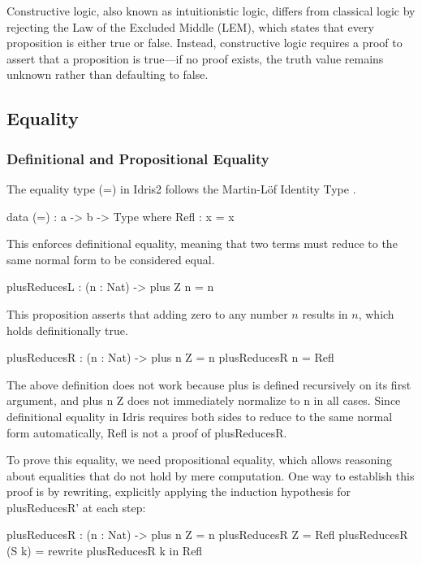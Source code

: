 \documentclass[]{rptuseminar}
\begin{document}
Constructive logic, also known as intuitionistic logic, differs from classical logic by rejecting the Law of the Excluded Middle (LEM), which states that every proposition is either true or false. Instead, constructive logic requires a proof to assert that a proposition is true—if no proof exists, the truth value remains unknown rather than defaulting to false.


\subsection{Equality}
\label{sec:Equality}

\subsubsection{Definitional and Propositional Equality}
The equality type (=) in Idris2 follows the Martin-Löf Identity Type .

\begin{idris}
data (=) : a -> b -> Type where  
Refl : x = x
\end{idris}

This enforces definitional equality, meaning that two terms must reduce to the same normal form to be considered equal.

\begin{idris}
plusReducesL : (n : Nat) -> plus Z n = n
\end{idris}

This proposition asserts that adding zero to any number \( n \) results in \( n \), which holds definitionally true.

\begin{idris}
plusReducesR : (n : Nat) -> plus n Z = n
plusReducesR n = Refl
\end{idris}
The above definition does not work because plus is defined recursively on its first argument, and plus n Z does not immediately normalize to n in all cases. Since definitional equality in Idris requires both sides to reduce to the same normal form automatically, Refl is not a proof of plusReducesR.

To prove this equality, we need propositional equality, which allows reasoning about equalities that do not hold by mere computation. One way to establish this proof is by rewriting, explicitly applying the induction hypothesis for plusReducesR' at each step:


\begin{idris}
plusReducesR : (n : Nat) -> plus n Z = n
plusReducesR Z = Refl 
plusReducesR (S k) = rewrite plusReducesR k in Refl  
\end{idris}
\end{document}
